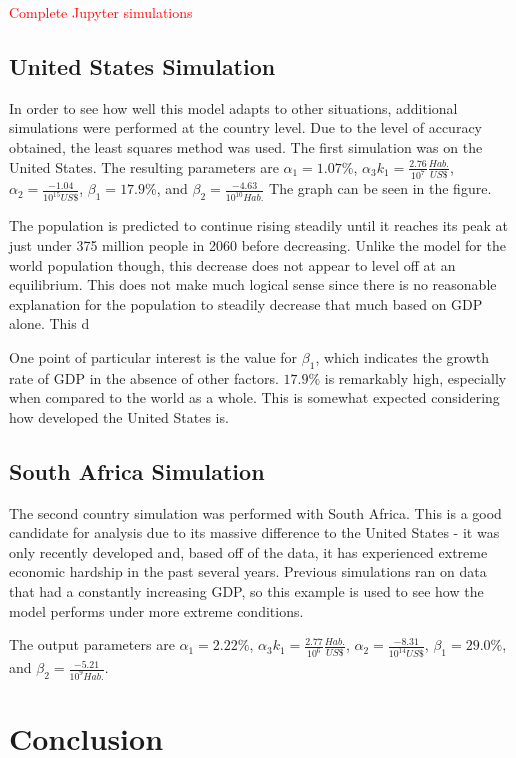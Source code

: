 \documentclass[a4paper]{article}
\newcommand{\todo}[1]{{\Large\textcolor{red}{#1}}}
\begin{document}
\todo{Complete Jupyter simulations}

\subsection{United States Simulation}

In order to see how well this model adapts to other situations, additional simulations were performed at the country level. Due to the level of accuracy obtained, the least squares method was used. The first simulation was on the United States. The resulting parameters are $\alpha_1 = 1.07\%$, $\alpha_3 k_1 = \frac{2.76}{10^{7}}\frac{Hab.}{US \$}$, $\alpha_2 = \frac{-1.04}{10^{15} US\$}$, $\beta_1 = 17.9\%$, and $\beta_2 = \frac{-4.63}{10^{10} Hab.}$ The graph can be seen in the figure.

The population is predicted to continue rising steadily until it reaches its peak at just under 375 million people in 2060 before decreasing. Unlike the model for the world population though, this decrease does not appear to level off at an equilibrium. This does not make much logical sense since there is no reasonable explanation for the population to steadily decrease that much based on GDP alone. This d

One point of particular interest is the value for $\beta_1$, which indicates the growth rate of GDP in the absence of other factors. $17.9\%$ is remarkably high, especially when compared to the world as a whole. This is somewhat expected considering how developed the United States is. 

\subsection{South Africa Simulation}

The second country simulation was performed with South Africa. This is a good candidate for analysis due to its massive difference to the United States - it was only recently developed and, based off of the data, it has experienced extreme economic hardship in the past several years. Previous simulations ran on data that had a constantly increasing GDP, so this example is used to see how the model performs under more extreme conditions.

The output parameters are $\alpha_1 = 2.22\%$, $\alpha_3 k_1 = \frac{2.77}{10^{6}}\frac{Hab.}{US \$}$, $\alpha_2 = \frac{-8.31}{10^{14} US\$}$, $\beta_1 = 29.0\%$, and $\beta_2 = \frac{-5.21}{10^{9} Hab.}$.

\section{Conclusion}
\end{document}
